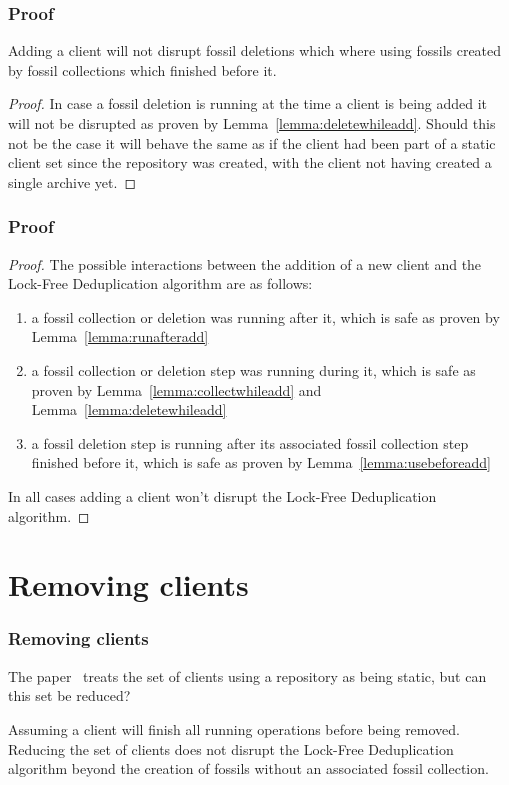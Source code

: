 \documentclass[english,utf8,aspectratio=169]{beamer}
\begin{document}
    \begin{frame}
        \frametitle{Proof}
        \begin{lemma}
            \label{lemma:usebeforeadd}
            Adding a client will not disrupt fossil deletions which where using fossils created by
            fossil collections which finished before it.
        \end{lemma}
        \begin{proof}
            In case a fossil deletion is running at the time a client is being added it will not
            be disrupted as proven by Lemma~\ref{lemma:deletewhileadd}.
            Should this not be the case it will behave the same as if the client had been part of a
            static client set since the repository was created, with the client not having created
            a single archive yet.
        \end{proof}
    \end{frame}

    \begin{frame}
        \frametitle{Proof}
        \begin{proof}
            The possible interactions between the addition of a new client and the Lock-Free
            Deduplication algorithm are as follows:
            \begin{enumerate}
                \item a fossil collection or deletion was running after it, which is safe as proven
                    by Lemma~\ref{lemma:runafteradd}
                \item a fossil collection or deletion step was running during it, which is safe as proven
                    by Lemma~\ref{lemma:collectwhileadd} and Lemma~\ref{lemma:deletewhileadd}
                \item a fossil deletion step is running after its associated fossil collection step
                    finished before it, which is safe as proven by Lemma~\ref{lemma:usebeforeadd}
            \end{enumerate}
            In all cases adding a client won't disrupt the Lock-Free Deduplication algorithm.
        \end{proof}
    \end{frame}

    \section{Removing clients}
    \begin{frame}
        \frametitle{Removing clients}
        The paper~\cite{Duplicacy} treats the set of clients using a repository as being static,
        but can this set be reduced?
        \begin{theorem}
            Assuming a client will finish all running operations before being removed.
            Reducing the set of clients does not disrupt the Lock-Free Deduplication algorithm beyond
            the creation of fossils without an associated fossil collection.
        \end{theorem}
    \end{frame}
\end{document}
